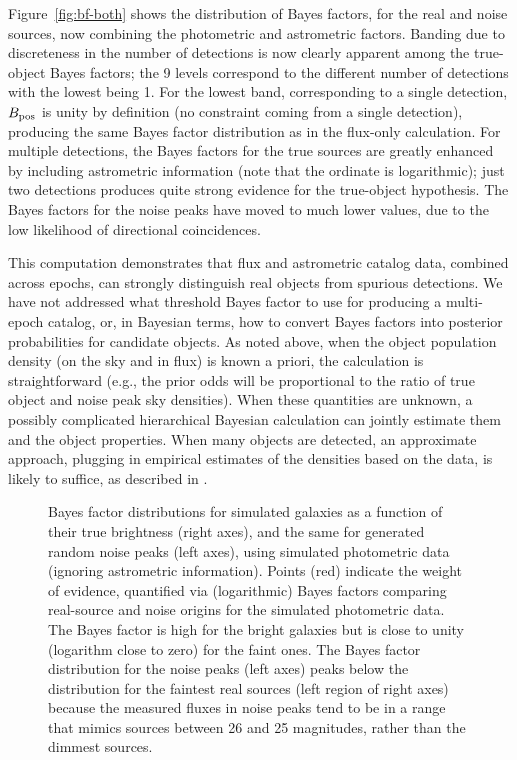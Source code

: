 \documentclass[twocolumn]{emulateapj}
\begin{document}
Figure~\ref{fig:bf-both} shows the distribution of Bayes factors, for the real and noise sources, now combining the photometric and astrometric factors.
Banding due to discreteness in the number of detections is now clearly apparent among the true-object Bayes factors; the 9 levels correspond to the different number of detections with the lowest being 1.
For the lowest band, corresponding to a single detection, $B_{\rm{}pos}$ is unity by definition (no constraint coming from a single detection), producing the same Bayes factor distribution as in the flux-only calculation.
For multiple detections, the Bayes factors for the true sources are greatly enhanced by including astrometric information (note that the ordinate is logarithmic); just two detections produces quite strong evidence for the true-object hypothesis.
The Bayes factors for the noise peaks have moved to much lower values, due to the low likelihood of directional coincidences.

This computation demonstrates that flux and astrometric catalog data, combined across epochs, can strongly distinguish real objects from spurious detections.
We have not addressed what threshold Bayes factor to use for producing a multi-epoch catalog, or, in Bayesian terms, how to convert Bayes factors into posterior probabilities for candidate objects.
As noted above, when the object population density (on the sky and in flux) is known a priori, the calculation is straightforward (e.g., the prior odds will be proportional to the ratio of true object and noise peak sky densities).
When these quantities are unknown, a possibly complicated hierarchical Bayesian calculation can jointly estimate them and the object properties.
When many objects are detected, an approximate approach, plugging in empirical estimates of the densities based on the data, is likely to suffice, as described in \cite{B12-SCMAXMatch,L12-HierXMatch}.


\color{red}
\begin{figure}
\caption{Bayes factor distributions for simulated galaxies as a function of their true brightness (right axes), and the same for generated random noise peaks (left axes), using simulated photometric data (ignoring astrometric information).
Points (red) indicate the weight of evidence, quantified via (logarithmic) Bayes factors comparing real-source and noise origins for the simulated photometric data.
The Bayes factor is high for the bright galaxies but is close to unity (logarithm close to zero) for the faint ones.
The Bayes factor distribution for the noise peaks (left axes) peaks below the distribution for the faintest real sources (left region of right axes) because the measured fluxes in noise peaks tend to be in a range that mimics sources between 26 and 25 magnitudes, rather than the dimmest sources.}
\label{fig:bf-photo}
\end{figure}
\end{document}
